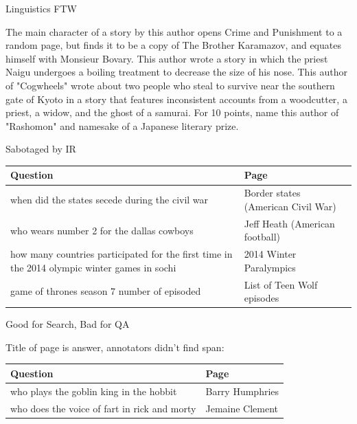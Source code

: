 \documentclass[xcolor=dvipsnames,xcolor=table]{beamer}
\begin{document}
\begin{frame}{Linguistics FTW}

  The main character of a story by \alert<2>{this author opens Crime and Punishment} to a
random page, but finds it to be a copy of The Brother Karamazov, and equates
himself with Monsieur Bovary. This author wrote a story in which the priest
Naigu undergoes a boiling treatment to decrease the size of his nose. This
author of "Cogwheels" wrote about two people who steal to survive near the
southern gate of Kyoto in a story that features inconsistent accounts from a
woodcutter, a priest, a widow, and the ghost of a samurai. For 10 points, name
this author of "Rashomon" and namesake of a Japanese literary prize. \\
\end{frame}




\begin{frame}{Sabotaged by IR}

  \begin{small}
  \begin{tabular}{p{7cm}p{3cm}}
    \toprule
    Question & Page \\
    \hline
 when did the states secede during the civil war &  Border states (American Civil War) \\
 who wears number 2 for the dallas cowboys &  Jeff Heath (American football) \\
 how many countries participated for the first time in the 2014 olympic winter games in sochi & 2014 Winter Paralympics \\
 game of thrones season 7 number of episoded &  List of Teen Wolf episodes \\
 \bottomrule
  \end{tabular}
  \end{small}

\end{frame}

\begin{frame}{Good for Search, Bad for QA}

  Title of page is answer, annotators didn't find span:
  \begin{tabular}{p{7cm}p{3cm}}
    \toprule
    Question & Page \\
    \hline
  who plays the goblin king in the hobbit &  Barry Humphries  \\
  who does the voice of fart in rick and morty & Jemaine Clement   \\
 \bottomrule
  \end{tabular}
\end{frame}
\end{document}
